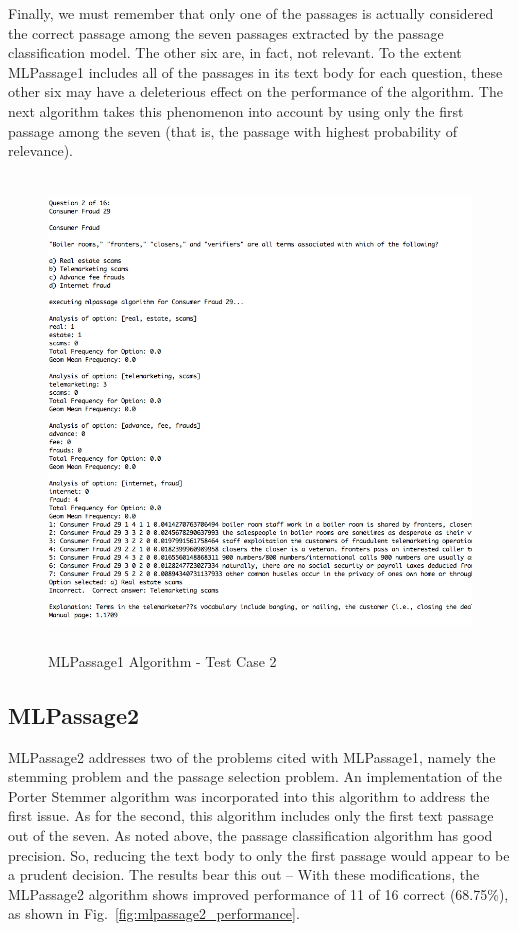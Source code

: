 Finally, we must remember that only one of the passages is actually considered the correct passage among the seven passages extracted by the passage classification model.  The other six are, in fact, not relevant.  To the extent MLPassage1 includes all of the passages in its text body for each question, these other six may have a deleterious effect on the performance of the algorithm.  The next algorithm takes this phenomenon into account by using only the first passage among the seven (that is, the passage with highest probability of relevance).

\begin{figure}
\centering
\vspace{1.0in}
\includegraphics[width=125mm, height=125mm]{mlpassage1_test_case_incorrect.png}
\caption{MLPassage1 Algorithm - Test Case 2}
\label{fig:mlpassage1_test_case_incorrect}
\end{figure}


\subsection{MLPassage2}

MLPassage2 addresses two of the problems cited with MLPassage1, namely the stemming problem and the passage selection problem.  An implementation of the Porter Stemmer algorithm was incorporated into this algorithm to address the first issue.  As for the second, this algorithm includes only the first text passage out of the seven.  As noted above, the passage classification algorithm has good precision.  So, reducing the text body to only the first passage would appear to be a prudent decision.  The results bear this out -- With these modifications, the MLPassage2 algorithm shows improved performance of 11 of 16 correct (68.75\%), as shown in Fig.~\ref{fig:mlpassage2_performance}.  


